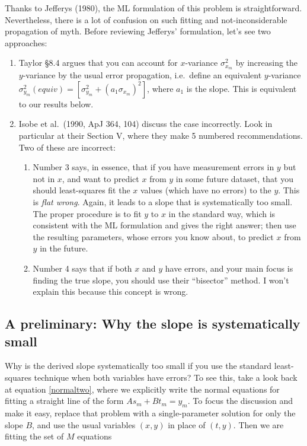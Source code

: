 \documentclass[psfig,preprint]{aastex}
\begin{document}
	Thanks to Jefferys (1980), the ML formulation of this problem is
straightforward. Nevertheless, there is a lot of confusion on such
fitting and not-inconsiderable propagation of myth. 
Before
reviewing Jefferys' formulation, let's see two approaches: \begin{enumerate}

	\item Taylor \S 8.4 argues that you can account for $x$-variance
$\sigma_{x_m}^2$ by increasing the $y$-variance by the usual error
propagation, i.e.\ define an equivalent $y$-variance
$\sigma_{y_m}^2(equiv) = [\sigma_{y_m}^2 + (a_1\sigma_{x_m})^2]$, where
$a_1$ is the slope. This is equivalent to our results below.

	\item Isobe et al.\ (1990, ApJ 364, 104) discuss the case
incorrectly.  Look in particular at their Section V, where they make 5
numbered recommendations. Two of these are incorrect: \begin{enumerate}

	\item Number 3 says, in essence, that if you have measurement
errors in $y$ but not in $x$, and want to predict $x$ from $y$ in some
future dataset, that you should least-squares fit the $x$ values (which
have no errors) to the $y$. This is {\it flat wrong}. Again, it leads to
a slope that is systematically too small. The proper procedure  is to
fit $y$ to $x$ in the standard way, which is consistent with the ML
formulation and gives the right answer; then use the resulting
parameters, whose errors you know about, to predict $x$ from $y$ in the
future.

	\item Number 4 says that if both $x$ and $y$ have errors, and your
main focus is finding the true slope, you should use their ``bisector''
method. I won't explain this because this concept is wrong. 
\end{enumerate}
\end{enumerate}

\subsection{A preliminary: Why the slope is systematically small}

	Why is the derived slope systematically too small if you use the
standard least-squares technique when both variables have errors? To see
this, take a look back at equation \ref{normaltwo}, where we explicitly
write the normal equations for fitting a straight line of the form $A
s_m + B t_m = y_m$. To focus the discussion and make it easy,
replace that problem with a single-parameter solution for only the slope
$B$, and use the usual variables $(x,y)$ in place of $(t,y)$. Then
we are fitting the set of $M$ equations
\end{document}
